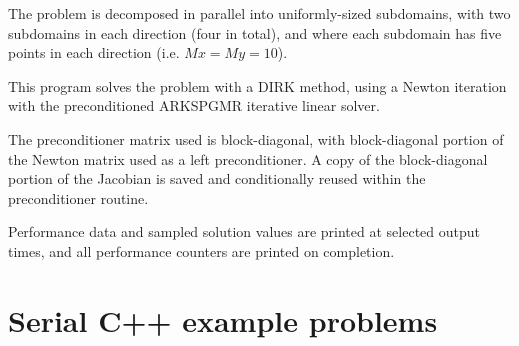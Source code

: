 \documentclass[letterpaper,10pt,english]{sphinxmanual}
\begin{document}
The problem is decomposed in parallel into uniformly-sized subdomains,
with two subdomains in each direction (four in total), and where each
subdomain has five points in each direction (i.e. $Mx=My=10$).

This program solves the problem with a DIRK method, using a Newton
iteration with the preconditioned ARKSPGMR iterative linear solver.

The preconditioner matrix used is block-diagonal, with block-diagonal
portion of the Newton matrix used as a left preconditioner.  A copy of
the block-diagonal portion of the Jacobian is saved and conditionally
reused within the preconditioner routine.

Performance data and sampled solution values are printed at
selected output times, and all performance counters are printed
on completion.


\chapter{Serial C++ example problems}
\label{cpp_serial:serial-cpp}\label{cpp_serial::doc}\label{cpp_serial:serial-c-example-problems}
\end{document}
